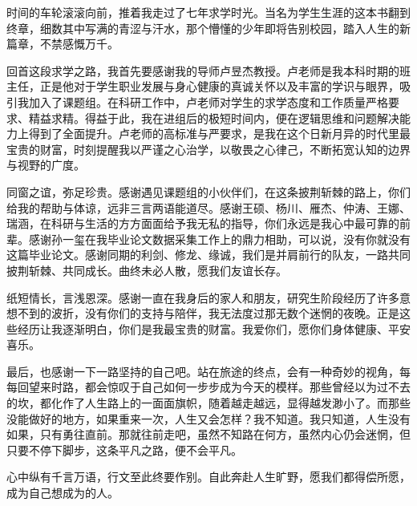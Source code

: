 时间的车轮滚滚向前，推着我走过了七年求学时光。当名为学生生涯的这本书翻到终章，细数其中写满的青涩与汗水，那个懵懂的少年即将告别校园，踏入人生的新篇章，不禁感慨万千。

回首这段求学之路，我首先要感谢我的导师卢昱杰教授。卢老师是我本科时期的班主任，正是他对于学生职业发展与身心健康的真诚关怀以及丰富的学识与眼界，吸引我加入了课题组。在科研工作中，卢老师对学生的求学态度和工作质量严格要求、精益求精。得益于此，我在进组后的极短时间内，便在逻辑思维和问题解决能力上得到了全面提升。卢老师的高标准与严要求，是我在这个日新月异的时代里最宝贵的财富，时刻提醒我以严谨之心治学，以敬畏之心律己，不断拓宽认知的边界与视野的广度。

同窗之谊，弥足珍贵。感谢遇见课题组的小伙伴们，在这条披荆斩棘的路上，你们给我的帮助与体谅，远非三言两语能道尽。感谢王硕、杨川、雁杰、仲涛、王娜、瑞涵，在科研与生活的方方面面给予我无私的指导，你们永远是我心中最可靠的前辈。感谢孙一玺在我毕业论文数据采集工作上的鼎力相助，可以说，没有你就没有这篇毕业论文。感谢同期的利剑、修龙、缘诚，我们是并肩前行的队友，一路共同披荆斩棘、共同成长。曲终未必人散，愿我们友谊长存。

纸短情长，言浅恩深。感谢一直在我身后的家人和朋友，研究生阶段经历了许多意想不到的波折，没有你们的支持与陪伴，我无法度过那无数个迷惘的夜晚。正是这些经历让我逐渐明白，你们是我最宝贵的财富。我爱你们，愿你们身体健康、平安喜乐。

最后，也感谢一下一路坚持的自己吧。站在旅途的终点，会有一种奇妙的视角，每每回望来时路，都会惊叹于自己如何一步步成为今天的模样。那些曾经以为过不去的坎，都化作了人生路上的一面面旗帜，随着越走越远，显得越发渺小了。而那些没能做好的地方，如果重来一次，人生又会怎样？我不知道。我只知道，人生没有如果，只有勇往直前。那就往前走吧，虽然不知路在何方，虽然内心仍会迷惘，但只要不停下脚步，这条平凡之路，便不会平凡。

心中纵有千言万语，行文至此终要作别。自此奔赴人生旷野，愿我们都得偿所愿，成为自己想成为的人。
